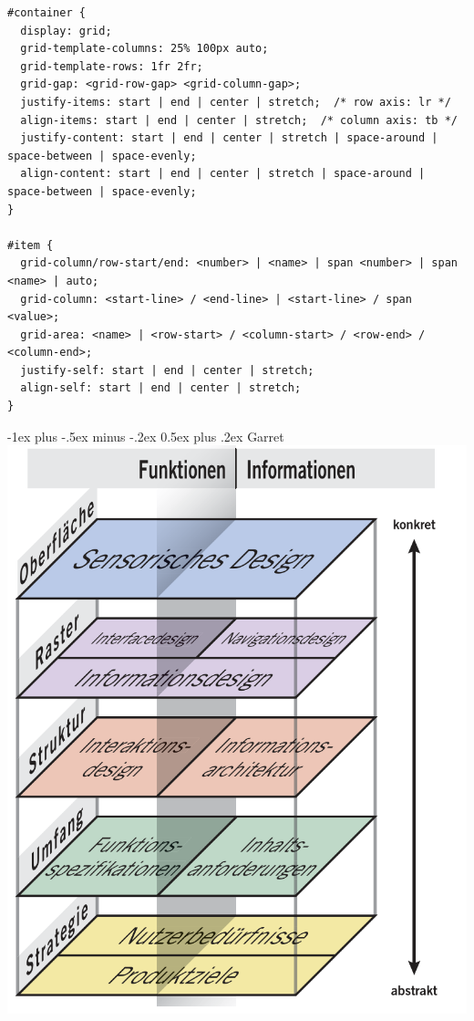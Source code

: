 \documentclass[10pt,landscape,a4paper]{article}
\makeatletter
\renewcommand{\section}{\@startsection{section}{1}{0mm}%
                                {-1ex plus -.5ex minus -.2ex}%
                                {0.5ex plus .2ex}%
                                {\normalfont\large\bfseries}}
\makeatother
\begin{document}
\begin{multicols*}{3}
\begin{verbatim}
#container {
  display: grid;
  grid-template-columns: 25% 100px auto;
  grid-template-rows: 1fr 2fr;
  grid-gap: <grid-row-gap> <grid-column-gap>;
  justify-items: start | end | center | stretch;  /* row axis: lr */
  align-items: start | end | center | stretch;  /* column axis: tb */
  justify-content: start | end | center | stretch | space-around | space-between | space-evenly;	
  align-content: start | end | center | stretch | space-around | space-between | space-evenly;	
}

#item {
  grid-column/row-start/end: <number> | <name> | span <number> | span <name> | auto;
  grid-column: <start-line> / <end-line> | <start-line> / span <value>;
  grid-area: <name> | <row-start> / <column-start> / <row-end> / <column-end>;
  justify-self: start | end | center | stretch;
  align-self: start | end | center | stretch;
}
\end{verbatim}

\begin{multicols}{2}
\section{Garret}
\includegraphics[width=0.8\linewidth]{garret.png}


\end{multicols}
\end{multicols*}
\end{document}
